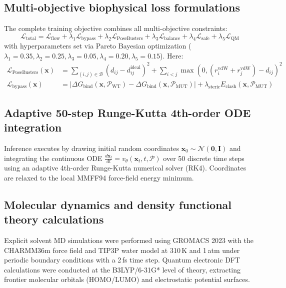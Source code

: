 \documentclass[11pt,a4paper]{article}
\begin{document}
\subsection*{Multi-objective biophysical loss formulations}
The complete training objective combines all multi-objective constraints:
\begin{equation}
\mathcal{L}_{\text{total}} = \mathcal{L}_{\text{flow}} + \lambda_1 \mathcal{L}_{\text{bypass}} + \lambda_2 \mathcal{L}_{\text{PoseBusters}} + \lambda_3 \mathcal{L}_{\text{balance}} + \lambda_4 \mathcal{L}_{\text{safe}} + \lambda_5 \mathcal{L}_{\text{QM}}
\end{equation}
with hyperparameters set via Pareto Bayesian optimization ($\lambda_1 = 0.35, \lambda_2 = 0.25, \lambda_3 = 0.05, \lambda_4 = 0.20, \lambda_5 = 0.15$). Here:
\begin{align}
\mathcal{L}_{\text{PoseBusters}}(\mathbf{x}) &= \sum_{(i,j) \in \mathcal{B}} \left( d_{ij} - d_{ij}^{\text{ideal}} \right)^2 + \sum_{i < j} \max\left(0, (r_i^{\text{vdW}} + r_j^{\text{vdW}}) - d_{ij}\right)^2 \\
\mathcal{L}_{\text{bypass}}(\mathbf{x}) &= \left| \Delta G_{\text{bind}}(\mathbf{x}, \mathcal{P}_{\text{WT}}) - \Delta G_{\text{bind}}(\mathbf{x}, \mathcal{P}_{\text{MUT}}) \right| + \lambda_{\text{steric}} E_{\text{clash}}(\mathbf{x}, \mathcal{P}_{\text{MUT}})
\end{align}

\subsection*{Adaptive 50-step Runge-Kutta 4th-order ODE integration}
Inference executes by drawing initial random coordinates $\mathbf{x}_0 \sim \mathcal{N}(\mathbf{0}, \mathbf{I})$ and integrating the continuous ODE $\frac{d\mathbf{x}_t}{dt} = v_\theta(\mathbf{x}_t, t, \mathcal{P})$ over 50 discrete time steps using an adaptive 4th-order Runge-Kutta numerical solver (RK4). Coordinates are relaxed to the local MMFF94 force-field energy minimum.

\subsection*{Molecular dynamics and density functional theory calculations}
Explicit solvent MD simulations were performed using GROMACS 2023 with the CHARMM36m force field and TIP3P water model at 310\,K and 1\,atm under periodic boundary conditions with a 2\,fs time step. Quantum electronic DFT calculations were conducted at the B3LYP/6-31G* level of theory, extracting frontier molecular orbitals (HOMO/LUMO) and electrostatic potential surfaces.
\end{document}
